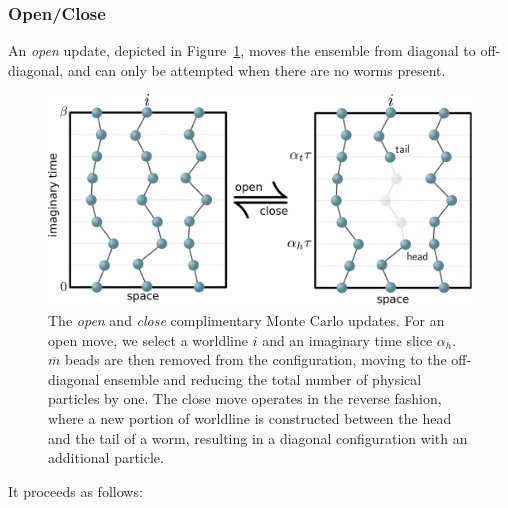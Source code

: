 \documentclass[prb,aps,amssym,nofootinbib,floatfix,notitlepage]{revtex4-1}
\begin{document}
\subsubsection{Open/Close}
An \emph{open} update, depicted in Figure~\ref{fig:openclose}, moves the
ensemble from diagonal to off-diagonal, and can only be attempted when there
are no worms present.  
%
\begin{figure}
\begin{center}
\includegraphics[width=0.70\columnwidth]{Figures/openclose.pdf}
\end{center}
\caption{The \emph{open} and \emph{close} complimentary Monte Carlo updates.
For an open move, we select a worldline $i$ and an imaginary time slice
$\alpha_h$.  $\overline{m}$ beads are then removed from the configuration,
moving to the off-diagonal ensemble and reducing the total number of physical
particles by one.  The close move operates in the reverse fashion, where a new
portion of worldline is constructed between the head and the tail of a worm,
resulting in a diagonal configuration with an additional particle.}
\label{fig:openclose}
 \end{figure}
%
It proceeds as follows:
\end{document}
